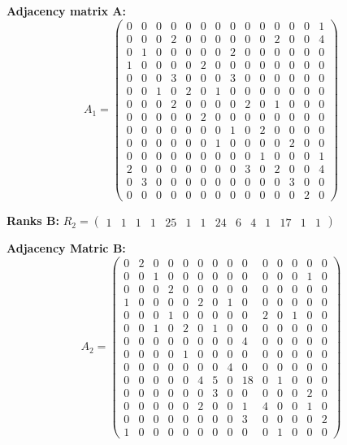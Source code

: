 \textbf{Adjacency matrix A:}
\[
A_1 = \begin{pmatrix}
0 & 0 & 0 & 0 & 0 & 0 & 0 & 0 & 0 & 0 & 0 & 0 & 0 & 1 \\
0 & 0 & 0 & 2 & 0 & 0 & 0 & 0 & 0 & 0 & 2 & 0 & 0 & 4 \\
0 & 1 & 0 & 0 & 0 & 0 & 0 & 2 & 0 & 0 & 0 & 0 & 0 & 0 \\
1 & 0 & 0 & 0 & 0 & 2 & 0 & 0 & 0 & 0 & 0 & 0 & 0 & 0 \\
0 & 0 & 0 & 3 & 0 & 0 & 0 & 3 & 0 & 0 & 0 & 0 & 0 & 0 \\
0 & 0 & 1 & 0 & 2 & 0 & 1 & 0 & 0 & 0 & 0 & 0 & 0 & 0 \\
0 & 0 & 0 & 2 & 0 & 0 & 0 & 0 & 2 & 0 & 1 & 0 & 0 & 0 \\
0 & 0 & 0 & 0 & 0 & 2 & 0 & 0 & 0 & 0 & 0 & 0 & 0 & 0 \\
0 & 0 & 0 & 0 & 0 & 0 & 0 & 1 & 0 & 2 & 0 & 0 & 0 & 0 \\
0 & 0 & 0 & 0 & 0 & 0 & 1 & 0 & 0 & 0 & 0 & 2 & 0 & 0 \\
0 & 0 & 0 & 0 & 0 & 0 & 0 & 0 & 0 & 1 & 0 & 0 & 0 & 1 \\
2 & 0 & 0 & 0 & 0 & 0 & 0 & 0 & 3 & 0 & 2 & 0 & 0 & 4 \\
0 & 3 & 0 & 0 & 0 & 0 & 0 & 0 & 0 & 0 & 0 & 3 & 0 & 0 \\
0 & 0 & 0 & 0 & 0 & 0 & 0 & 0 & 0 & 0 & 0 & 0 & 2 & 0
\end{pmatrix}
\]



\textbf{Ranks B:} $R_2 = \begin{pmatrix}
1 & 1 & 1 & 1 & 25 & 1 & 1 & 24 & 6 & 4 & 1 & 17 & 1 & 1
\end{pmatrix}$

\textbf{Adjacency Matric B:}
\[
A_2 = \begin{pmatrix}
0 & 2 & 0 & 0 & 0 & 0 & 0 & 0 & 0 & 0 & 0 & 0 & 0 & 0 \\
0 & 0 & 1 & 0 & 0 & 0 & 0 & 0 & 0 & 0 & 0 & 0 & 1 & 0 \\
0 & 0 & 0 & 2 & 0 & 0 & 0 & 0 & 0 & 0 & 0 & 0 & 0 & 0 \\
1 & 0 & 0 & 0 & 0 & 2 & 0 & 1 & 0 & 0 & 0 & 0 & 0 & 0 \\
0 & 0 & 0 & 1 & 0 & 0 & 0 & 0 & 0 & 2 & 0 & 1 & 0 & 0 \\
0 & 0 & 1 & 0 & 2 & 0 & 1 & 0 & 0 & 0 & 0 & 0 & 0 & 0 \\
0 & 0 & 0 & 0 & 0 & 0 & 0 & 0 & 4 & 0 & 0 & 0 & 0 & 0 \\
0 & 0 & 0 & 0 & 1 & 0 & 0 & 0 & 0 & 0 & 0 & 0 & 0 & 0 \\
0 & 0 & 0 & 0 & 0 & 0 & 0 & 4 & 0 & 0 & 0 & 0 & 0 & 0 \\
0 & 0 & 0 & 0 & 0 & 4 & 5 & 0 & 18 & 0 & 1 & 0 & 0 & 0 \\
0 & 0 & 0 & 0 & 0 & 0 & 3 & 0 & 0 & 0 & 0 & 0 & 2 & 0 \\
0 & 0 & 0 & 0 & 0 & 2 & 0 & 0 & 1 & 4 & 0 & 0 & 1 & 0 \\
0 & 0 & 0 & 0 & 0 & 0 & 0 & 0 & 3 & 0 & 0 & 0 & 0 & 2 \\
1 & 0 & 0 & 0 & 0 & 0 & 0 & 0 & 0 & 0 & 1 & 0 & 0 & 0
\end{pmatrix}
\]

